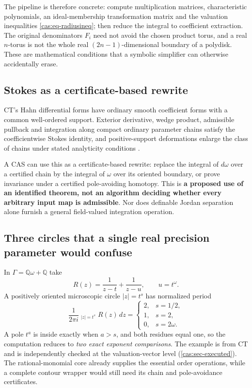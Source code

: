 \documentclass[11pt,letterpaper]{article}
\numberwithin{equation}{section}
\theoremstyle{definition}
\theoremstyle{remark}
\newcommand{\Q}{\mathbb Q}
\newcommand{\HInt}{\mathop{\int^{\!H}}\nolimits}
\begin{document}
The pipeline is therefore concrete: compute multiplication matrices,
characteristic polynomials, an ideal-membership transformation matrix and the
valuation inequalities \eqref{cas:eq-radiusineq}; then reduce the integral to
coefficient extraction. The original denominators $F_i$ need not avoid the
chosen product torus, and a real $n$-torus is not the whole real
$(2n-1)$-dimensional boundary of a polydisk. These are mathematical conditions
that a symbolic simplifier can otherwise accidentally erase.

\subsection{Stokes as a certificate-based rewrite}
\label{cas:sub-stokes}
CT's Hahn differential forms have ordinary smooth coefficient forms with a
common well-ordered support. Exterior derivative, wedge product, admissible
pullback and integration along compact ordinary parameter chains satisfy the
coefficientwise Stokes identity, and positive-support deformations enlarge the
class of chains under stated analyticity conditions \cite{cas:SourceCT}.

A CAS can use this as a certificate-based rewrite: replace the integral of
$d\omega$ over a certified chain by the integral of $\omega$ over its oriented
boundary, or prove invariance under a certified pole-avoiding homotopy. This is
\textbf{a proposed use of an identified theorem, not an algorithm deciding
whether every arbitrary input map is admissible}. Nor does definable Jordan
separation alone furnish a general field-valued integration operation.

\subsection{Three circles that a single real precision parameter would confuse}
\label{cas:sub-threecircles}
In $\Gamma=\Q\omega+\Q$ take
\[
 R(z)=\frac1{z-t}+\frac1{z-u},\qquad u=t^\omega .
\]
A positively oriented microscopic circle $|z|=t^s$ has normalized period
\begin{equation}\label{cas:eq-threecircles}
 \frac1{2\pi i}\HInt_{|z|=t^s}R(z)\,dz
 =\begin{cases}2,&s=1/2,\\ 1,&s=2,\\ 0,&s=2\omega.\end{cases}
\end{equation}
A pole $t^a$ is inside exactly when $a>s$, and both residues equal one, so the
computation reduces to \emph{two exact exponent comparisons}. The example is
from CT and is independently checked at the valuation-vector level
(\cref{cas:sec-executed}). The rational-monomial core already supplies the
essential order operations, while a complete contour wrapper would still need
its chain and pole-avoidance certificates.
\end{document}
